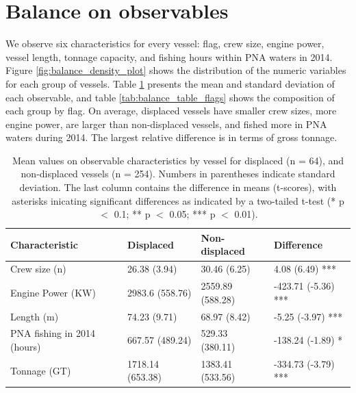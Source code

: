 \documentclass[12pt]{article}
\begin{document}
\section{Balance on observables}

We observe six characteristics for every vessel: flag, crew size, engine power, vessel length, tonnage capacity, and fishing hours within PNA waters in 2014. Figure \ref{fig:balance_density_plot} shows the distribution of the numeric variables for each group of vessels. Table \ref{tab:balance_table} presents the mean and standard deviation of each observable, and table \ref{tab:balance_table_flags} shows the composition of each group by flag. On average, displaced vessels have smaller crew sizes, more engine power, are larger than non-displaced vessels, and fished more in PNA waters during 2014. The largest relative difference is in terms of gross tonnage. 

\begin{table}[H]
\caption{\label{tab:balance_table}Mean values on observable characteristics by vessel for displaced (n = 64), and non-displaced vessels (n = 254). Numbers in parentheses indicate standard deviation. The last column contains the difference in means (t-scores), with asterisks inicating significant differences as indicated by a two-tailed t-test (* p $<$ 0.1; ** p $<$ 0.05; *** p $<$ 0.01).}
\centering
\begin{tabular}{l|l|l|l}
\hline
Characteristic & Displaced & Non-displaced & Difference\\
\hline
Crew size (n) & 26.38 (3.94) & 30.46 (6.25) & 4.08 (6.49) ***\\
\hline
Engine Power (KW) & 2983.6 (558.76) & 2559.89 (588.28) & -423.71 (-5.36) ***\\
\hline
Length (m) & 74.23 (9.71) & 68.97 (8.42) & -5.25 (-3.97) ***\\
\hline
PNA fishing in 2014 (hours) & 667.57 (489.24) & 529.33 (380.11) & -138.24 (-1.89) *\\
\hline
Tonnage (GT) & 1718.14 (653.38) & 1383.41 (533.56) & -334.73 (-3.79) ***\\
\hline
\end{tabular}
\end{table}
\end{document}
